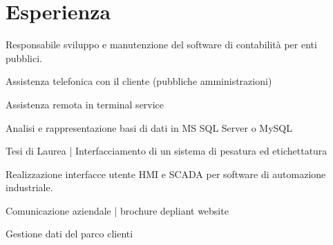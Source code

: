 \documentclass[a4paper]{deedy-resume} %
\begin{document}
\begin{minipage}[t]{0.66\textwidth} %


\section{Esperienza}


\vspace{\topsep} %
\begin{tightitemize}
\item Responsabile sviluppo e manutenzione del software di contabilità per enti pubblici.
\item Assistenza telefonica con il cliente (pubbliche amministrazioni)
\item Assistenza remota in terminal service
\item Analisi e rappresentazione basi di dati in MS SQL Server o MySQL
\end{tightitemize}

\sectionspace %



\begin{tightitemize}
\item Tesi di Laurea | Interfacciamento di un sistema di pesatura ed etichettatura 
\item Realizzazione interfacce utente HMI e SCADA per software di automazione industriale.
\end{tightitemize}

\sectionspace %



\begin{tightitemize}
\item Comunicazione aziendale | brochure \textbullet{} depliant \textbullet{} website\item Gestione dati del parco clienti
\end{tightitemize}


\end{minipage}
\end{document}
